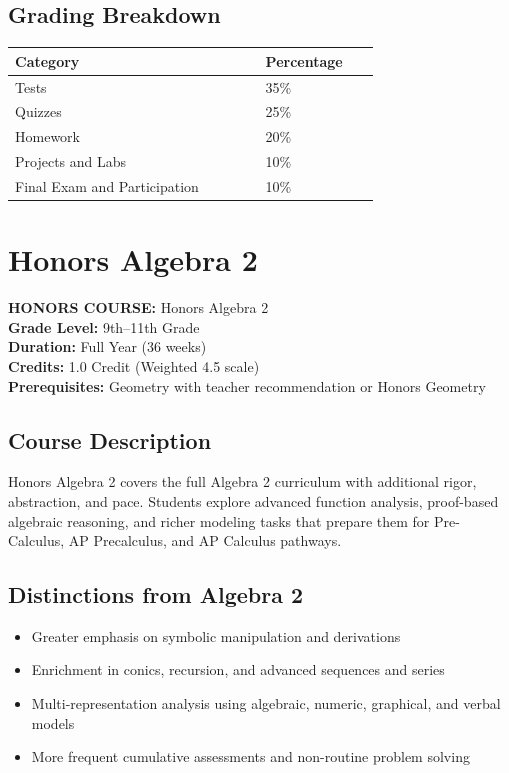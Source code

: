 \documentclass[12pt,oneside]{book}
\begin{document}
\section{Grading Breakdown}
\begin{center}
\begin{tabular}{L{0.55\linewidth}L{0.25\linewidth}}
\toprule
\textbf{Category} & \textbf{Percentage} \\
\midrule
Tests & 35\% \\
Quizzes & 25\% \\
Homework & 20\% \\
Projects and Labs & 10\% \\
Final Exam and Participation & 10\% \\
\bottomrule
\end{tabular}
\end{center}

\chapter{Honors Algebra 2}

\noindent\textbf{HONORS COURSE:} Honors Algebra 2\\
\textbf{Grade Level:} 9th--11th Grade\\
\textbf{Duration:} Full Year (36 weeks)\\
\textbf{Credits:} 1.0 Credit (Weighted 4.5 scale)\\
\textbf{Prerequisites:} Geometry with teacher recommendation or Honors Geometry

\section{Course Description}
Honors Algebra 2 covers the full Algebra 2 curriculum with additional rigor, abstraction, and pace. Students
explore advanced function analysis, proof-based algebraic reasoning, and richer modeling tasks that prepare
them for Pre-Calculus, AP Precalculus, and AP Calculus pathways.

\section{Distinctions from Algebra 2}
\begin{itemize}[leftmargin=2em]
    \item Greater emphasis on symbolic manipulation and derivations
    \item Enrichment in conics, recursion, and advanced sequences and series
    \item Multi-representation analysis using algebraic, numeric, graphical, and verbal models
    \item More frequent cumulative assessments and non-routine problem solving
\end{itemize}
\end{document}
